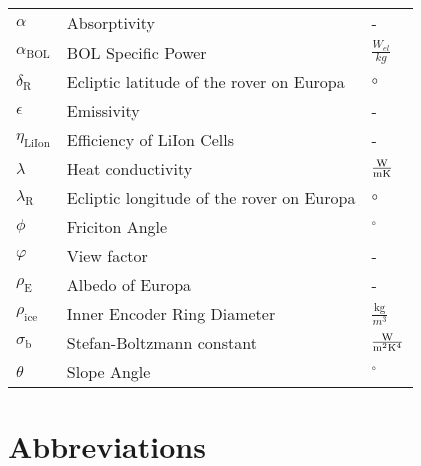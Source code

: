 \begin{longtable}[l]{lll}
$\alpha$				&	Absorptivity								& -  							\\
$\alpha_\text{BOL}$		&	BOL Specific Power							& $\frac{W_{el}}{kg}$			\\
$\delta_\text{R}$				&	Ecliptic latitude of the rover on Europa	& $\circ$						\\
\(\epsilon\)			&	Emissivity 									&	-							\\
$\eta_\text{LiIon}$		&	Efficiency of LiIon Cells					& -								\\
$\lambda$				&	Heat conductivity							& $\frac{{\rm W}}{{\rm m} {\rm K}}$			\\
$\lambda_\text{R}$				&	Ecliptic longitude of the rover on Europa	& $\circ$						\\
\(\phi\)				&	Friciton Angle								& \(^\circ\)					\\
$\varphi$				&	View factor									& -								\\
\(\rho_\text{E}\)		&	Albedo of Europa			  				&	-	\\
\(\rho_\text{ice}\)		&	Inner Encoder Ring Diameter  				&	\(\frac{\text{kg}}{m^3}\)	\\
$\sigma_\text{b}$ 				&	Stefan-Boltzmann constant					& $\frac{{\rm W}}{{\rm m}^2{\rm K}^4}$ \\
\(\theta\)				&	Slope Angle									& \(^\circ\)					\\




\end{longtable}

\chapter*{Abbreviations}


